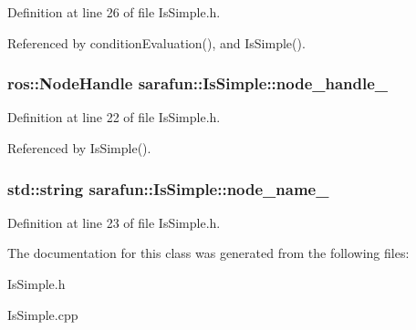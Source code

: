 Definition at line 26 of file Is\-Simple.\-h.



Referenced by condition\-Evaluation(), and Is\-Simple().

\hypertarget{classsarafun_1_1IsSimple_a461e5f5f34c94f31f81c11ebd5ccbdc3_a461e5f5f34c94f31f81c11ebd5ccbdc3}{
\subsubsection[{node\-\_\-handle\-\_\-}]{\setlength{\rightskip}{0pt plus 5cm}ros\-::\-Node\-Handle sarafun\-::\-Is\-Simple\-::node\-\_\-handle\-\_\-\hspace{0.3cm}{\ttfamily [private]}}}\label{classsarafun_1_1IsSimple_a461e5f5f34c94f31f81c11ebd5ccbdc3_a461e5f5f34c94f31f81c11ebd5ccbdc3}


Definition at line 22 of file Is\-Simple.\-h.



Referenced by Is\-Simple().

\hypertarget{classsarafun_1_1IsSimple_a93a14fccdb5329357b784cb6eb71e2e1_a93a14fccdb5329357b784cb6eb71e2e1}{
\subsubsection[{node\-\_\-name\-\_\-}]{\setlength{\rightskip}{0pt plus 5cm}std\-::string sarafun\-::\-Is\-Simple\-::node\-\_\-name\-\_\-\hspace{0.3cm}{\ttfamily [private]}}}\label{classsarafun_1_1IsSimple_a93a14fccdb5329357b784cb6eb71e2e1_a93a14fccdb5329357b784cb6eb71e2e1}


Definition at line 23 of file Is\-Simple.\-h.



The documentation for this class was generated from the following files\-:\begin{DoxyCompactItemize}
\item 
Is\-Simple.\-h\item 
Is\-Simple.\-cpp\end{DoxyCompactItemize}
